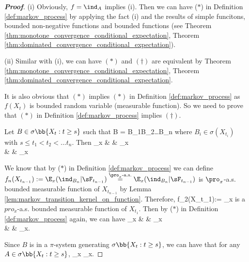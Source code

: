 \begin{proof}[\bf Proof]
\ben
\item [(i)] Obviously, $f = \ind_A$ implies (i). Then we can have ($*$) in Definition \ref{def:markov_process} by applying the fact (i) and the results of simple funcitons, bounded non-negative functions and bounded functions (see Theorem \ref{thm:monotone_convergence_conditional_expectation}, Theorem \ref{thm:dominated_convergence_conditional_expectation}).

\item [(ii)] Similar with (i), we can have $(*)$ and $(\dag)$ are equivalent by Theorem \ref{thm:monotone_convergence_conditional_expectation}, Theorem \ref{thm:dominated_convergence_conditional_expectation}. 

It is also obvious that $(*)$ implies $(*)$ in Definition \ref{def:markov_process} as $f(X_t)$ is bounded random variable (measurable function). So we need to prove that $(*)$ in Definition \ref{def:markov_process} implies $(\dag)$.

Let $B\in \sigma\bb{X_t:t\geq s}$ such that 
\be
B = B_1\cap B_2\cap \dots \cap B_n
\ee
where $B_i \in \sigma(X_{t_i})$ with $s\leq t_1<t_2<\dots t_n$. Then
\beast
\E_x &  & \E_x \\
&  & \E_x
\eeast

We know that by ($*$) in Definition \ref{def:markov_process} we can define $f_n(X_{t_{n-1}}) := \E_x(\ind_{B_n}|\sF_{t_{n-1}}) \stackrel{\pro_x\text{-a.s.}}{=}  \E_x(\ind_{B_n}|\sF_{t_{n-1}})$ is $\pro_x$-a.s. bounded measurable function of $X_{t_{n-1}}$ by Lemma \ref{lem:markov_transition_kernel_on_function}. Therefore,
\be
f_2(X_{t_1}):= \E_x
\ee
is a $pro_x$-a.s. bounded measurable function of $X_{t_1}$. Then by ($*$) in Definition \ref{def:markov_process} again, we can have 
\beast
\E_x  &  & \E_x \\
&   & \E_x. 
\eeast

Since $B$ is in a $\pi$-system generating $\sigma\bb{X_t:t\geq s}$, we can have that for any $A\in \sigma\bb{X_t:t\geq s}$, 
\be
\E_x   \E_x.
\ee


\end{proof}
